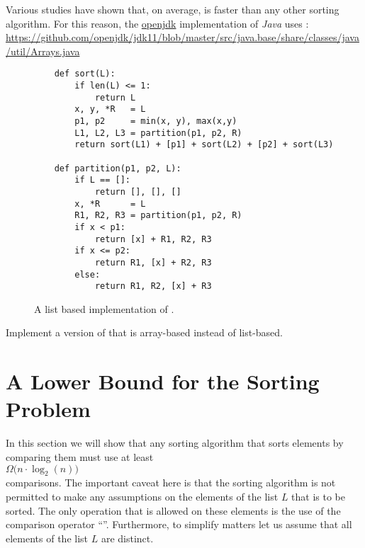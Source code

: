 \begin{enumerate}
      Various studies have shown that, on average,  is faster than any other sorting
      algorithm.  For this reason, the \href{https://github.com/openjdk}{openjdk} implementation of
      \textsl{Java} uses : 
      \\[0.2cm]
      \hspace*{-0.6cm}
      \href{https://github.com/openjdk/jdk11/blob/master/src/java.base/share/classes/java/util/Arrays.java}{https://github.com/openjdk/jdk11/blob/master/src/java.base/share/classes/java/util/Arrays.java} 
\end{enumerate}

\begin{figure}[!ht]
\centering
\begin{verbatim}
    def sort(L):
        if len(L) <= 1:
            return L
        x, y, *R   = L
        p1, p2     = min(x, y), max(x,y)
        L1, L2, L3 = partition(p1, p2, R)
        return sort(L1) + [p1] + sort(L2) + [p2] + sort(L3)
    
    def partition(p1, p2, L):
        if L == []:
            return [], [], []
        x, *R      = L
        R1, R2, R3 = partition(p1, p2, R)
        if x < p1:
            return [x] + R1, R2, R3
        if x <= p2:
            return R1, [x] + R2, R3
        else:
            return R1, R2, [x] + R3
\end{verbatim}
\vspace*{-0.3cm}
\caption{A list based implementation of .}
\label{fig:dual-pivot-quick-sort.stlx}
\end{figure}

\exercise
Implement a version of  that is array-based instead of list-based.
\eoxs


\section{A Lower Bound for the Sorting Problem}
In this section we will show that any sorting algorithm that sorts elements by comparing them must
use at least 
\\[0.2cm]
\hspace*{1.3cm}
 $\Omega\bigl(n \cdot \log_2(n)\bigr)$ 
\\[0.2cm]
comparisons.  The important caveat here is that the sorting algorithm is not permitted to make any assumptions
on the elements of the list $L$ that is to be sorted.  The only operation that is allowed on these
elements is the use of the comparison operator ``\mytt{<}''.  Furthermore, to simplify matters let
us assume that all elements of the list $L$ are distinct.


